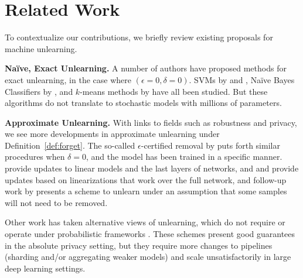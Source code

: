 \section{Related Work}
To contextualize our contributions, 
we briefly review existing proposals for machine unlearning. 

\noindent\textbf{Na\"ive, Exact Unlearning.}
A number of authors have proposed methods for exact unlearning, in the case where $(\epsilon=0, \delta=0)$. SVMs by \cite{romero2007incremental} and \cite{karasuyama2009multiple}, Na\"ive Bayes Classifiers by \cite{cao2015towards}, and $k$-means methods by \cite{ginart2019making} have all been studied. 
But these algorithms do not translate to stochastic models with millions of parameters.

\noindent\textbf{Approximate Unlearning.} 
With links to fields such as robustness and privacy, we see more developments in approximate unlearning under Definition~\ref{def:forget}. 
The so-called $\epsilon$-certified removal by \cite{guo2019certified} puts forth similar procedures when $\delta=0$, and the model has been trained in a specific manner.
\cite{guo2019certified,izzo2020approximate} provide updates to linear models and the last layers of networks, and 
\cite{golatkar2020forgetting} and\cite{golatkar2020eternal} provide updates based on linearizations that work over the full network, and follow-up work by \cite{Golatkar_2021_CVPR} presents a scheme to unlearn under an assumption that some samples will not need to be removed.

Other work has taken alternative views of unlearning, which do not require or operate under probabilistic frameworks \citep{bourtoule2021machine,neel2021descent}. These schemes present good guarantees in the absolute privacy setting, but they require more changes to  pipelines (sharding and/or aggregating weaker models) and scale unsatisfactorily in large deep learning settings.